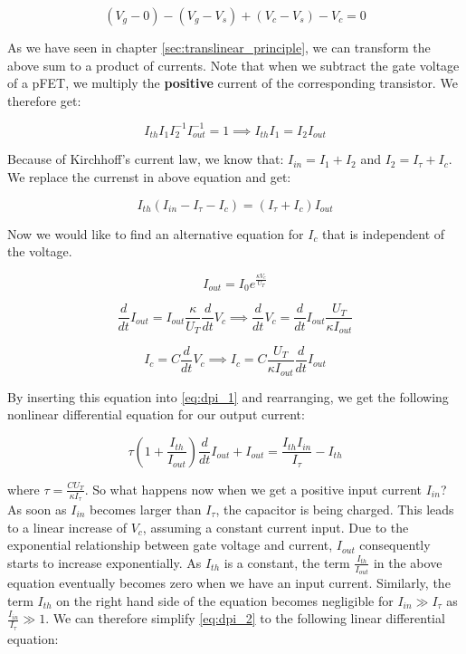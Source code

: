 \begin{equation}
    (V_g - 0) - (V_g - V_s) + (V_c - V_s) - V_c = 0
\end{equation}

As we have seen in chapter \ref{sec:translinear_principle}, we can transform the above sum to a product of currents. Note that when we subtract the gate voltage of a pFET, we multiply the \textbf{positive} current of the corresponding transistor. We therefore get:

\begin{equation}
    I_{th} I_1 I_2^{-1} I_{out}^{-1} = 1 \implies I_{th} I_1 = I_2 I_{out}
\end{equation}

Because of Kirchhoff's current law, we know that: $I_{in} = I_1 + I_2$ and $I_2 = I_{\tau} + I_c$. We replace the currenst in above equation and get:

\begin{equation}
    I_{th} (I_{in} - I_{\tau} - I_c) = (I_{\tau} + I_c) I_{out}\label{eq:dpi_1}
\end{equation}

Now we would like to find an alternative equation for $I_c$ that is independent of the voltage.

\begin{equation}
    I_{out} = I_0 e^{\frac{\kappa V_c}{U_T}}
\end{equation}

\begin{equation}
    \frac{d}{dt} I_{out} = I_{out} \frac{\kappa}{U_T} \frac{d}{dt} V_c \implies\frac{d}{dt} V_c = \frac{d}{dt} I_{out} \frac{U_T}{\kappa I_{out}}
\end{equation}

\begin{equation}
    I_c = C \frac{d}{dt} V_c \implies I_c = C \frac{U_T}{\kappa I_{out}} \frac{d}{dt} I_{out}
\end{equation}

By inserting this equation into \eqref{eq:dpi_1} and rearranging, we get the following nonlinear differential equation for our output current:

\begin{equation}
    \tau (1 + \frac{I_{th}}{I_{out}}) \frac{d}{dt} I_{out} + I_{out} = \frac{I_{th} I_{in}}{I_{\tau}} - I_{th}\label{eq:dpi_2}
\end{equation}

where $\tau = \frac{C U_T}{\kappa I_{\tau}}$. So what happens now when we get a positive input current $I_{in}$? As soon as $I_{in}$ becomes larger than $I_{\tau}$, the capacitor is being charged. This leads to a linear increase of $V_c$, assuming a constant current input. Due to the exponential relationship between gate voltage and current, $I_{out}$ consequently starts to increase exponentially. As $I_{th}$ is a constant, the term $\frac{I_{th}}{I_{out}}$ in the above equation eventually becomes zero when we have an input current. Similarly, the term $I_{th}$ on the right hand side of the equation becomes negligible for $I_{in} \gg I_{\tau}$ as $\frac{I_{in}}{I_{\tau}} \gg 1$. We can therefore simplify \eqref{eq:dpi_2} to the following linear differential equation:

